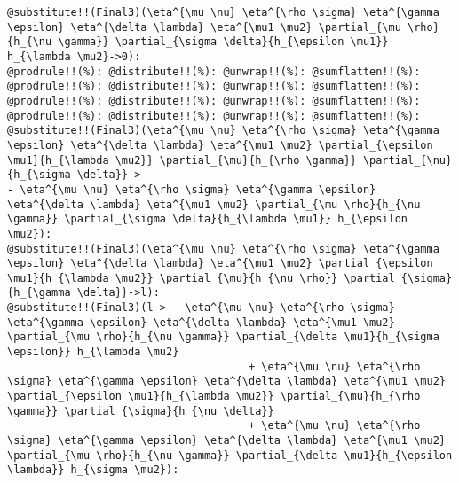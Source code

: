 \documentclass[11pt]{article}
\begin{document}
{\color[named]{Blue}\begin{verbatim}
@substitute!!(Final3)(\eta^{\mu \nu} \eta^{\rho \sigma} \eta^{\gamma \epsilon} \eta^{\delta \lambda} \eta^{\mu1 \mu2} \partial_{\mu \rho}{h_{\nu \gamma}} \partial_{\sigma \delta}{h_{\epsilon \mu1}} h_{\lambda \mu2}->0):
@prodrule!!(%): @distribute!!(%): @unwrap!!(%): @sumflatten!!(%):
@prodrule!!(%): @distribute!!(%): @unwrap!!(%): @sumflatten!!(%):
@prodrule!!(%): @distribute!!(%): @unwrap!!(%): @sumflatten!!(%):
@prodrule!!(%): @distribute!!(%): @unwrap!!(%): @sumflatten!!(%):
@substitute!!(Final3)(\eta^{\mu \nu} \eta^{\rho \sigma} \eta^{\gamma \epsilon} \eta^{\delta \lambda} \eta^{\mu1 \mu2} \partial_{\epsilon \mu1}{h_{\lambda \mu2}} \partial_{\mu}{h_{\rho \gamma}} \partial_{\nu}{h_{\sigma \delta}}->
- \eta^{\mu \nu} \eta^{\rho \sigma} \eta^{\gamma \epsilon} \eta^{\delta \lambda} \eta^{\mu1 \mu2} \partial_{\mu \rho}{h_{\nu \gamma}} \partial_{\sigma \delta}{h_{\lambda \mu1}} h_{\epsilon \mu2}):
@substitute!!(Final3)(\eta^{\mu \nu} \eta^{\rho \sigma} \eta^{\gamma \epsilon} \eta^{\delta \lambda} \eta^{\mu1 \mu2} \partial_{\epsilon \mu1}{h_{\lambda \mu2}} \partial_{\mu}{h_{\nu \rho}} \partial_{\sigma}{h_{\gamma \delta}}->l):
@substitute!!(Final3)(l-> - \eta^{\mu \nu} \eta^{\rho \sigma} \eta^{\gamma \epsilon} \eta^{\delta \lambda} \eta^{\mu1 \mu2} \partial_{\mu \rho}{h_{\nu \gamma}} \partial_{\delta \mu1}{h_{\sigma \epsilon}} h_{\lambda \mu2} 
                                      + \eta^{\mu \nu} \eta^{\rho \sigma} \eta^{\gamma \epsilon} \eta^{\delta \lambda} \eta^{\mu1 \mu2} \partial_{\epsilon \mu1}{h_{\lambda \mu2}} \partial_{\mu}{h_{\rho \gamma}} \partial_{\sigma}{h_{\nu \delta}}
                                      + \eta^{\mu \nu} \eta^{\rho \sigma} \eta^{\gamma \epsilon} \eta^{\delta \lambda} \eta^{\mu1 \mu2} \partial_{\mu \rho}{h_{\nu \gamma}} \partial_{\delta \mu1}{h_{\epsilon \lambda}} h_{\sigma \mu2}): 


\end{verbatim}}
\end{document}
